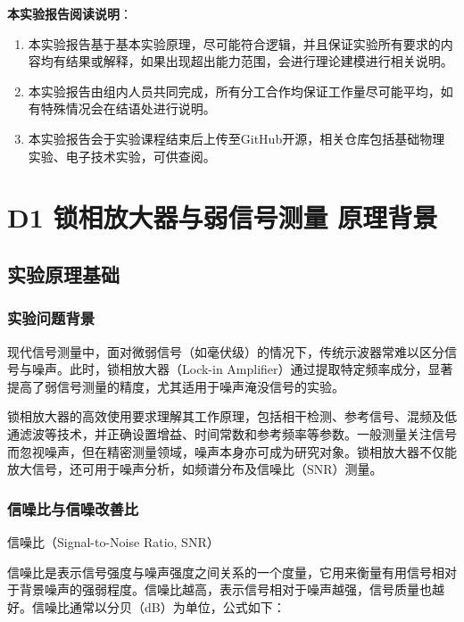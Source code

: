 \documentclass[dvipsnames, svgnames,a4paper,11pt]{article}
\begin{document}
		
	
		
	

	
		
	 \textbf{本实验报告阅读说明}：
		\begin{enumerate}
			\item 本实验报告基于基本实验原理，尽可能符合逻辑，并且保证实验所有要求的内容均有结果或解释，如果出现超出能力范围，会进行理论建模进行相关说明。
			\item 本实验报告由组内人员共同完成，所有分工合作均保证工作量尽可能平均，如有特殊情况会在结语处进行说明。
			\item 本实验报告会于实验课程结束后上传至GitHub开源，相关仓库包括基础物理实验、电子技术实验，可供查阅。
		\end{enumerate}
	\clearpage
	\tableofcontents
	\clearpage
	
	
	
	
	\setcounter{section}{0}
	\section{D1 锁相放大器与弱信号测量 \quad\heiti 原理背景}
	
	\subsection{实验原理基础}
	\subsubsection{实验问题背景}
	现代信号测量中，面对微弱信号（如毫伏级）的情况下，传统示波器常难以区分信号与噪声。此时，锁相放大器（Lock-in Amplifier）通过提取特定频率成分，显著提高了弱信号测量的精度，尤其适用于噪声淹没信号的实验。

锁相放大器的高效使用要求理解其工作原理，包括相干检测、参考信号、混频及低通滤波等技术，并正确设置增益、时间常数和参考频率等参数。一般测量关注信号而忽视噪声，但在精密测量领域，噪声本身亦可成为研究对象。锁相放大器不仅能放大信号，还可用于噪声分析，如频谱分布及信噪比（SNR）测量。

\subsubsection{信噪比与信噪改善比}

信噪比（Signal-to-Noise Ratio, SNR）

信噪比是表示信号强度与噪声强度之间关系的一个度量，它用来衡量有用信号相对于背景噪声的强弱程度。信噪比越高，表示信号相对于噪声越强，信号质量也越好。信噪比通常以分贝（dB）为单位，公式如下：
\end{document}
